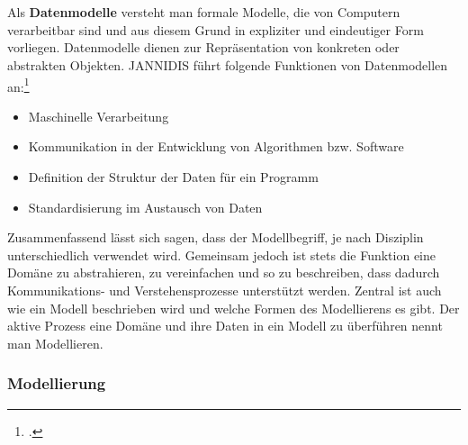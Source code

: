 \documentclass[12pt,a4paper]{article}
\begin{document}
\\
\\
Als \textbf{Datenmodelle} versteht man formale Modelle, die von Computern verarbeitbar sind und aus diesem Grund in expliziter und eindeutiger Form vorliegen. Datenmodelle dienen zur Repräsentation von konkreten oder abstrakten Objekten. JANNIDIS führt folgende Funktionen von Datenmodellen an:\footcite[][S.99-100]{jannidis2017grundlagen}
\begin{itemize}
\item Maschinelle Verarbeitung
\item Kommunikation in der Entwicklung von Algorithmen bzw. Software
\item Definition der Struktur der Daten für ein Programm
\item Standardisierung im Austausch von Daten
\end{itemize}
Zusammenfassend lässt sich sagen, dass der Modellbegriff, je nach Disziplin unterschiedlich verwendet wird. Gemeinsam jedoch ist stets die Funktion eine Domäne zu abstrahieren, zu vereinfachen und so zu beschreiben, dass dadurch Kommunikations- und Verstehensprozesse unterstützt werden. Zentral ist auch wie ein Modell beschrieben wird und welche Formen des Modellierens es gibt. Der aktive Prozess eine Domäne und ihre Daten in ein Modell zu überführen nennt man Modellieren.

\subsubsection{Modellierung}
\label{Modellierung}
\end{document}
